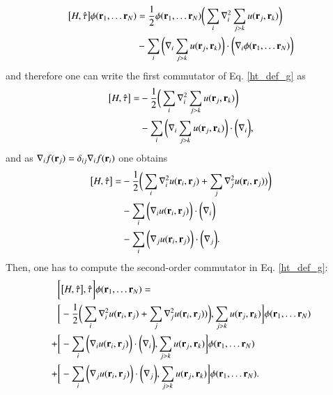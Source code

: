 \documentclass[aip,jcp,reprint,noshowkeys,superscriptaddress]{revtex4-1}
\newcommand{\br}[0]{{\bf {r}}}
\begin{document}
\begin{equation}
 \label{eq:com1_3}
  \begin{aligned}
 \big[ H,\hat{\tau} \big]\phi(\br{}_1,\hdots \br{}_N) & =  \frac{1}{2}\phi(\br{}_1,\hdots \br{}_N) \bigg( \sum_i \nabla^2_i \sum_{j>k} u(\br{}_j,\br{}_k) \bigg) \\
  & -\sum_i \bigg(\nabla_i \sum_{j>k} u(\br{}_j,\br{}_k) \bigg) \cdot \bigg( \nabla_i \phi(\br{}_1,\hdots \br{}_N) \bigg)
 \end{aligned}
\end{equation}
and therefore one can write the first commutator of Eq. \eqref{ht_def_g} as 
\begin{equation}
 \label{eq:com1_4}
 \begin{aligned}
  \big[ H,\hat{\tau} \big] =& -\frac{1}{2} \bigg( \sum_i \nabla^2_i \sum_{j>k} u(\br{}_j,\br{}_k) \bigg) \\
                            & -\sum_i \bigg(\nabla_i \sum_{j>k} u(\br{}_j,\br{}_k) \bigg) \cdot \bigg( \nabla_i  \bigg),
 \end{aligned}
\end{equation}
and as $\nabla_i f(\br{}_j) = \delta_{ij} \nabla_i f(\br{}_i)$ one obtains 
\begin{equation}
 \label{eq:com1_5}
 \begin{aligned}
  \big[ H,\hat{\tau} \big] =& -\frac{1}{2} \bigg( \sum_i \nabla^2_i u(\br{}_i,\br{}_j) + \sum_j \nabla^2_j u(\br{}_i,\br{}_j) ) \bigg) \\
                            & -\sum_i \bigg(\nabla_i u(\br{}_i,\br{}_j)\bigg) \cdot \bigg( \nabla_i  \bigg) \\
                            & -\sum_i \bigg(\nabla_j u(\br{}_i,\br{}_j)\bigg) \cdot \bigg( \nabla_j  \bigg).  
 \end{aligned}
\end{equation}
Then, one has to compute the second-order commutator in Eq. \eqref{ht_def_g}: 
\begin{equation}
 \label{eq:com2_1}
 \begin{aligned}
 & \bigg[ \big[H,\hat{\tau}\big],\hat{\tau}\bigg] \phi(\br{}_1,\hdots \br{}_N) = \\
 & \bigg[ -\frac{1}{2} \bigg( \sum_i \nabla^2_i u(\br{}_i,\br{}_j) + \sum_j \nabla^2_j u(\br{}_i,\br{}_j) ) \bigg), \sum_{j>k} u(\br{}_j,\br{}_k)  \bigg] \phi(\br{}_1,\hdots \br{}_N) \\
+& \bigg[ -\sum_i \bigg(\nabla_i u(\br{}_i,\br{}_j)\bigg) \cdot \bigg( \nabla_i  \bigg), \sum_{j>k} u(\br{}_j,\br{}_k) \bigg] \phi(\br{}_1,\hdots \br{}_N) \\
+& \bigg[ -\sum_i \bigg(\nabla_j u(\br{}_i,\br{}_j)\bigg) \cdot \bigg( \nabla_j  \bigg), \sum_{j>k} u(\br{}_j,\br{}_k) \bigg] \phi(\br{}_1,\hdots \br{}_N). 
 \end{aligned}
\end{equation}
\end{document}

